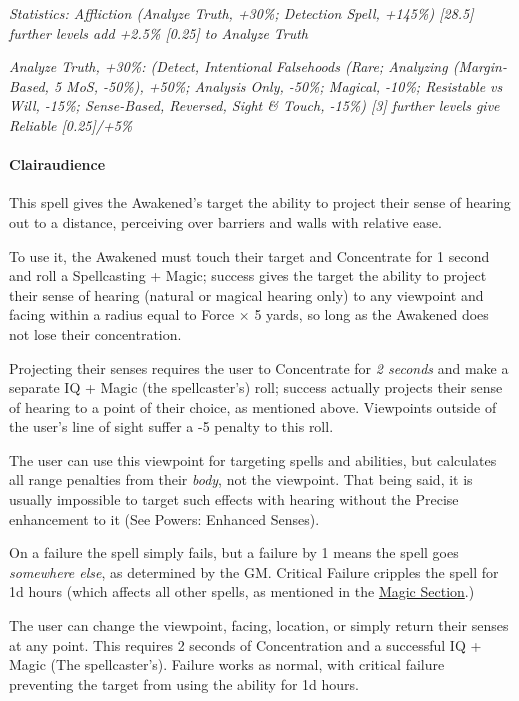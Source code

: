 \begin{multicols*}{3}
	\textcolor{OliveGreen}{\textit{ Statistics: Affliction (Analyze Truth, +30\%; Detection Spell, +145\%) [28.5] further levels add +2.5\% [0.25] to Analyze Truth}}
	
	\textcolor{OliveGreen}{\textit{Analyze Truth, +30\%: (Detect, Intentional Falsehoods (Rare; Analyzing (Margin-Based, 5 MoS, -50\%), +50\%; Analysis Only, -50\%; Magical, -10\%; Resistable vs Will, -15\%; Sense-Based, Reversed, Sight \& Touch, -15\%) [3] further levels give Reliable [0.25]/+5\%}}
	
	\paragraph{Clairaudience}
		
	This spell gives the Awakened's target the ability to project their sense of hearing out to a distance, perceiving over barriers and walls with relative ease.
	
	To use it, the Awakened must touch their target and Concentrate for 1 second and roll a Spellcasting + Magic; success gives the target the ability to project their sense of hearing (natural or magical hearing only) to any viewpoint and facing within a radius equal to Force $\times$ 5 yards, so long as the Awakened does not lose their concentration. 
	
	Projecting their senses requires the user to Concentrate for \textit{2 seconds} and make a separate IQ + Magic (the spellcaster's) roll; success actually projects their sense of hearing to a point of their choice, as mentioned above. Viewpoints outside of the user's line of sight suffer a -5 penalty to this roll.
	
	The user can use this viewpoint for targeting spells and abilities, but calculates all range penalties from their \textit{body}, not the viewpoint. That being said, it is usually impossible to target such effects with hearing without the Precise enhancement to it (See Powers: Enhanced Senses).
	
	On a failure the spell simply fails, but a failure by 1 means the spell goes \textit{somewhere else}, as determined by the GM. Critical Failure cripples the spell for 1d hours (which affects all other spells, as mentioned in the \hyperref[magic]{Magic Section}.)
	
	The user can change the viewpoint, facing, location, or simply return their senses at any point. This requires 2 seconds of Concentration and a successful IQ + Magic (The spellcaster's). Failure works as normal, with critical failure preventing the target from using the ability for 1d hours.
	

\end{multicols*}
